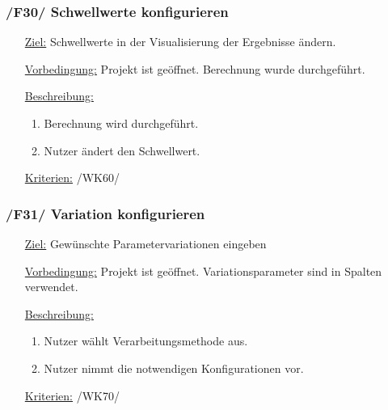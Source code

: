 \documentclass{article}
\begin{document}
\subsubsection*{\textbf{/F30/} Schwellwerte konfigurieren} \label{sec:f:Schwellwerte konfigurieren}
\begin{itemize}
    \item[\underline{Ziel:}] Schwellwerte in der Visualisierung der Ergebnisse ändern.
    \item[\underline{Vorbedingung:}] Projekt ist geöffnet. Berechnung wurde durchgeführt.
    \item[\underline{Beschreibung:}]
    \begin{enumerate}
        \item Berechnung wird durchgeführt.
        \item Nutzer ändert den Schwellwert.
    \end{enumerate}
    \item[\underline{Kriterien:}] /WK60/
\end{itemize}

\subsubsection*{\textbf{/F31/} Variation konfigurieren} \label{sec:f:Variation konfigurieren}
\begin{itemize}
    \item[\underline{Ziel:}] Gewünschte Parametervariationen eingeben
    \item[\underline{Vorbedingung:}] Projekt ist geöffnet. Variationsparameter sind in Spalten verwendet.
    \item[\underline{Beschreibung:}]
    \begin{enumerate}
        \item Nutzer wählt Verarbeitungsmethode aus.
        \item Nutzer nimmt die notwendigen Konfigurationen vor.
    \end{enumerate}
    \item[\underline{Kriterien:}] /WK70/
\end{itemize}
\end{document}
